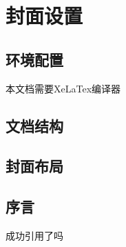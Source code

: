 
\chapter{封面设置}

\section{环境配置}
本文档需要XeLaTex编译器

\section{文档结构}


\section{封面布局}

\section{序言}
成功引用了吗\cite{adve1996shared}



